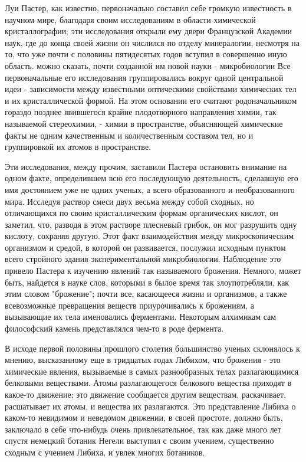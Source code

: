 Луи  Пастер,   как  известно,   первоначально  составил   себе   громкую
известность в  научном мире,  благодаря  своим исследованиям  в  области
химической  кристаллографии;   эти   исследования  открыли   ему   двери
Французской Академии  наук, где  до  конца своей  жизни он  числился  по
отделу минералогии, несмотря на то, что уже почти с половины пятидесятых
годов вступил в совершенно иную область. можно сказать, почти  созданной
им новой  науки  -  микробиологии Все  первоначальные  его  исследования
группировались  вокруг  одной  центральной  идеи  -  зависимости   между
известными оптическими свойствами  химических тел  и их  кристаллической
формой. На этом  основании его считают  родоначальником гораздо  позднее
явившегося  крайне  плодотворного  направления  химии,  так   называемой
стереохимии, -  химии в  пространстве, объясняющей  химические факты  не
одним качественным и количественным составом  тел, но и группировкой  их
атомов в пространстве.

Эти исследования, между прочим, заставили Пастера остановить внимание на
одном факте, определившем  всю его  последующую деятельность,  сделавшую
его имя  достоянием  уже  не  одних  ученых,  а  всего  образованного  и
необразованного мира.  Исследуя раствор  смеси двух  весьма между  собой
сходных, но отличающихся  по своим  кристаллическим формам  органических
кислот, он заметил, что,  разводя в этом  растворе плесневый грибок,  он
мог разрушить одну  кислоту, сохраняя другую.  Этот факт  взаимодействия
между микроскопическим организмом  и средой, в  которой он  развивается,
послужил  исходным  пунктом  всего  стройного  здания  экспериментальной
микробиологии. Наблюдение  это привело  Пастера к  изучению явлений  так
называемого брожения.  Немного,  может  быть,  найдется  в  науке  слов,
которыми в былое время так  злоупотребляли, как этим словом  "брожение";
почти  все,  касающееся  жизни   и  организмов,  а  также   всевозможные
превращения веществ  приурочивались к  брожениям, а  вызывающие их  тела
именовались  ферментами.  Некоторым  алхимикам  сам  философский  камень
представлялся чем-то в роде фермента.

В исходе первой половины прошлого столетия большинство ученых склонялось
к мнению, высказанному еще в тридцатых  годах Либихом, что брожения -
это  химические  явления,   вызываемые  в   самых  разнообразных   телах
разлагающимися  белковыми  веществами.  Атомы  разлагающегося  белкового
вещества приходят в  какое-то движение; это  движение сообщается  другим
веществам, раскачивает, расшатывает их атомы, и вещества их разлагаются.
Это представление Либиха  о каком-то невидимом  и неведомом движении,  в
своей  простоте,  должно  быть,   заключало  в  себе  что-нибудь   очень
привлекательное, так как даже много  лет спустя немецкий ботаник  Негели
выступил с своим учением, существенно сходным с учением Либиха, и  увлек
многих ботаников.

